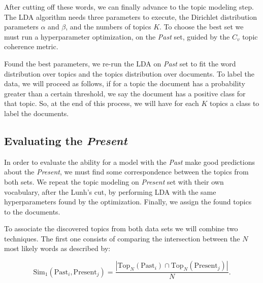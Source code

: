 
After cutting off these words, we can finally advance to the topic modeling step. The LDA algorithm needs three parameters to execute, the Dirichlet distribution parameters $\alpha$ and $\beta$, and the numbers of topics $K$. To choose the best set we must run a hyperparameter optimization, on the \textit{Past} set, guided by the $C_{v}$ topic coherence metric.

Found the best parameters, we re-run the LDA on \textit{Past} set to fit the word distribution over topics and the topics distribution over documents. To label the data, we will proceed as follows, if for a topic the document has a probability greater than a certain threshold, we say the document has a positive class for that topic. So, at the end of this process, we will have for each $K$ topics a class to label the documents.

\subsection{Evaluating the \textit{Present}}\label{sec:material-combination}

In order to evaluate the ability for a model with the \textit{Past} make good predictions about the \textit{Present}, we must find some correspondence between the topics from both sets. We repeat the topic modeling on \textit{Present} set with their own vocabulary, after the Lunh's cut, by performing LDA with the same hyperparameters found by the optimization. Finally, we assign the found topics to the documents.

To associate the discovered topics from both data sets we will combine two techniques. The first one consists of comparing the intersection between the $N$ most likely words as described by:

\begin{equation}
	\label{eq:top-n-match}
	\text{Sim}_{1}\left(\text{Past}_{i}, \text{Present}_{j}\right) = \dfrac{|\text{Top}_{N}(\text{Past}_{i}) \cap \text{Top}_{N}(\text{Present}_{j})|}{N} \text{.}
\end{equation}

